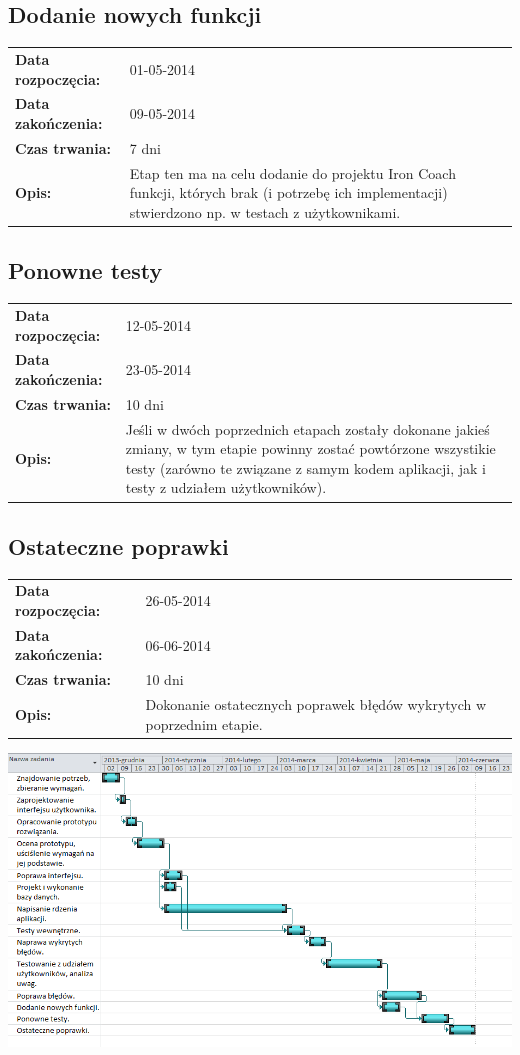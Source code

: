 \subsection{Dodanie nowych funkcji}
	\begin{tabular}{l p{5cm}}
		\textbf{Data rozpoczęcia:} & 01-05-2014\\
		\textbf{Data zakończenia:} & 09-05-2014\\
		\textbf{Czas trwania:} & 7 dni\\
		\textbf{Opis:} & Etap ten ma na celu dodanie do projektu Iron Coach funkcji, których brak (i potrzebę ich implementacji) stwierdzono np. w testach z użytkownikami.
	\end{tabular}
\subsection{Ponowne testy}
	\begin{tabular}{l p{5cm}}
		\textbf{Data rozpoczęcia:} & 12-05-2014\\
		\textbf{Data zakończenia:} & 23-05-2014\\
		\textbf{Czas trwania:} & 10 dni\\
		\textbf{Opis:} & Jeśli w dwóch poprzednich etapach zostały dokonane jakieś zmiany, w tym etapie powinny zostać powtórzone wszystikie testy (zarówno te związane z samym kodem aplikacji, jak i testy z udziałem użytkowników).
	\end{tabular}
\subsection{Ostateczne poprawki}
	\begin{tabular}{l p{5cm}}
		\textbf{Data rozpoczęcia:} & 26-05-2014\\
		\textbf{Data zakończenia:} & 06-06-2014\\
		\textbf{Czas trwania:} & 10 dni\\
		\textbf{Opis:} & Dokonanie ostatecznych poprawek błędów wykrytych w poprzednim etapie.
	\end{tabular}

\newpage
  \includegraphics[angle=270]{wykres_gantta2.png}

